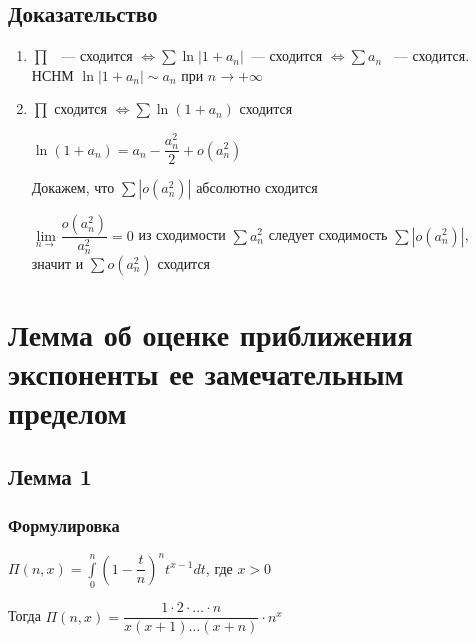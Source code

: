 \documentclass{article}
\begin{document}
        \subsection{Доказательство}
        
            \begin{enumerate}
            
                \item $\prod$ ~--- сходится $\Leftrightarrow \sum \ln |1 + a_n| $~--- сходится $\Leftrightarrow \sum a_n$ ~--- сходится. НСНМ $\ln |1 + a_n| \sim a_n$ при $n \rightarrow +\infty$
                
                \item $\prod$ сходится $\Leftrightarrow \sum \ln (1 + a_n)$ сходится
                
                    $\ln(1 + a_n) = a_n - \dfrac{a^2_n}{2} + o(a^2_n)$
                    
                    Докажем, что $\sum |o(a^2_n)|$ абсолютно сходится
                    
                    $\lim\limits_{n \rightarrow} \dfrac{o(a^2_n)}{a^2_n} = 0$ из сходимости $\sum a^2_n$ следует сходимость $\sum |o(a^2_n)|$, значит и $\sum o(a^2_n)$ сходится
                
            \end{enumerate}
            
    \newpage
    
    \section{Лемма об оценке приближения экспоненты ее замечательным пределом}
    
        \subsection{Лемма 1}
        
            \subsubsection{Формулировка}
            
                $\Pi(n, x) = \int\limits^n_0 \left(1 - \dfrac{t}{n} \right)^n t^{x - 1} dt$, где $x > 0$
                
                Тогда $\Pi(n, x) = \dfrac{1 \cdot 2 \cdot \ldots \cdot n}{x(x + 1)\ldots(x+n)} \cdot n^x$
                
\end{document}

